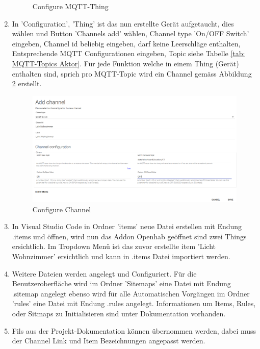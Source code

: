\begin{enumerate}
\begin{figure}[H]
	\caption{Configure MQTT-Thing} 	
	\label{pic: Configure MQTT-Thing}
\end{figure} 
\item In 'Configuration', 'Thing' ist das nun erstellte Gerät aufgetaucht, dies wählen und Button 'Channels add' wählen, Channel type 'On/OFF Switch' eingeben, Channel id beliebig eingeben, darf keine Leerschläge enthalten, Entsprechende MQTT Configurationen eingeben, Topic siehe Tabelle \ref{tab: MQTT-Topics Aktor}. Für jede Funktion welche in einem Thing (Gerät) enthalten sind, sprich pro MQTT-Topic wird ein Channel gemäss Abbildung \ref{pic: Configure Channel} erstellt.
   \begin{figure}[H]
	\centering
	\includegraphics[width=\textwidth]{graphics/Channel.PNG}
	\caption{Configure Channel} 	
	\label{pic: Configure Channel}
\end{figure} 
\item In Visual Studio Code in Ordner 'items' neue Datei erstellen mit Endung .items und öffnen, wird nun das Addon Openhab geöffnet sind zwei Things ersichtlich. Im Tropdown Menü ist das zuvor erstellte item 'Licht Wohnzimmer' ersichtlich und kann in .items Datei importiert werden.
\item Weitere Dateien werden angelegt und Configuriert. Für die Benutzeroberfläche wird im Ordner 'Sitemaps' eine Datei mit Endung .sitemap angelegt ebenso wird für alle Automatischen Vorgängen im Ordner 'rules' eine Datei mit Endung .rules angelegt. Informationen um Items, Rules, oder Sitmaps zu Initialisieren sind unter Dokumentation \cite{noauthor_introduction_nodate} vorhanden.
\item	Fils aus der Projekt-Dokumentation können übernommen werden, dabei muss der Channel Link und Item Bezeichnungen angepasst werden.
\end{enumerate}	